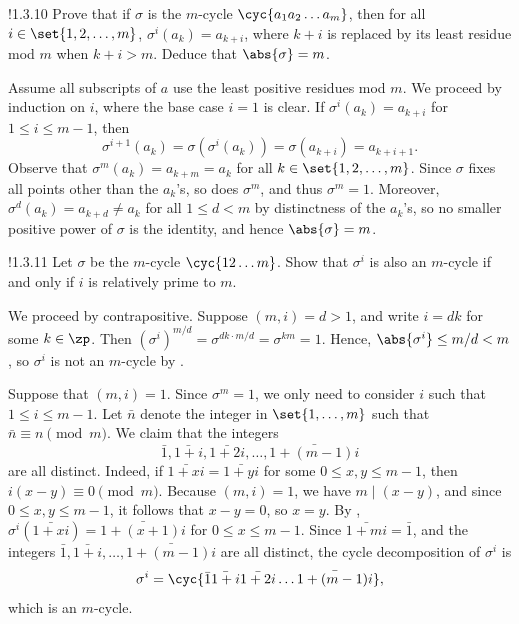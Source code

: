 \begin{exercise}!{1.3.10}
    Prove that if $\sigma$ is the $m$-cycle $\cyc{a_1 a_2 \ldots{} a_m}$, then for all $i \in \set{1, 2, \dots, m}$, $\sigma^i(a_k) = a_{k+i}$, where $k+i$ is replaced by its least residue mod $m$ when $k+i > m$.
	Deduce that $\abs{\sigma} = m$.
\end{exercise}

\begin{sol}
    Assume all subscripts of $a$ use the least positive residues mod $m$.
	We proceed by induction on $i$, where the base case $i = 1$ is clear.
	If $\sigma^i(a_k) = a_{k + i}$ for $1 \leq i \leq m - 1$, then
    \[
    	\sigma^{i + 1}(a_k) = \sigma(\sigma^i(a_k)) = \sigma(a_{k + i}) = a_{k + i + 1}.
    \]
    Observe that $\sigma^m(a_k) = a_{k+m} = a_k$ for all $k \in \set{1, 2, \dots, m}$.
    Since $\sigma$ fixes all points other than the $a_k$'s, so does $\sigma^m$, and thus $\sigma^m = 1$.
    Moreover, $\sigma^d(a_k) = a_{k+d} \neq a_k$ for all $1 \leq d < m$ by distinctness of the $a_k$'s, so no smaller positive power of $\sigma$ is the identity, and hence $\abs{\sigma} = m$.
\end{sol}

\begin{exercise}!{1.3.11}
    Let $\sigma$ be the $m$-cycle $\cyc{1 2 \ldots{} m}$.
	Show that $\sigma^i$ is also an $m$-cycle if and only if $i$ is relatively prime to $m$.
\end{exercise}

\begin{soliff}
    \rightimp We proceed by contrapositive.
    Suppose $(m, i) = d > 1$, and write $i = dk$ for some $k \in \zp$.
    Then $(\sigma^i)^{m/d} = \sigma^{dk \cdot m/d} = \sigma^{km} = 1$.
    Hence, $\abs{\sigma^i} \leq m/d < m$, so $\sigma^i$ is not an $m$-cycle by .
    
    \leftimp Suppose that $(m, i) = 1$.
    Since $\sigma^m = 1$, we only need to consider $i$ such that $1 \leq i \leq m - 1$.
    Let $\bar n$ denote the integer in $\set{1, \ldots, m}$ such that $\bar n \equiv n \pmod m$.
    We claim that the integers
    \[
        \bar 1, \bar{1 + i}, \bar{1 + 2i}, \ldots, \bar{1 + (m - 1)i}
    \]
    are all distinct.
    Indeed, if $\bar{1 + xi} = \bar{1 + yi}$ for some $0 \leq x, y \leq m - 1$, then $i(x - y) \equiv 0 \pmod m$.
    Because $(m, i) = 1$, we have $m \mid (x - y)$, and since $0 \leq x, y \leq m - 1$, it follows that $x - y = 0$, so $x = y$.
    By , $\sigma^i(\bar{1 + xi}) = \bar{1 + (x + 1)i}$ for $0 \leq x \leq m - 1$.
    Since $\bar{1 + mi} = \bar 1$, and the integers $\bar 1, \bar{1 + i}, \ldots, \bar{1 + (m - 1)i}$ are all distinct, the cycle decomposition of $\sigma^i$ is
    \[
        \sigma^i = \cyc{\bar{1} \bar{1 + i} \bar{1 + 2i} \ldots \bar{1 + (m - 1)i}},
    \]
    which is an $m$-cycle.
\end{soliff}

